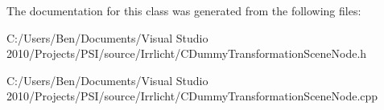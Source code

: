 The documentation for this class was generated from the following files\-:\begin{DoxyCompactItemize}
\item 
C\-:/\-Users/\-Ben/\-Documents/\-Visual Studio 2010/\-Projects/\-P\-S\-I/source/\-Irrlicht/C\-Dummy\-Transformation\-Scene\-Node.\-h\item 
C\-:/\-Users/\-Ben/\-Documents/\-Visual Studio 2010/\-Projects/\-P\-S\-I/source/\-Irrlicht/C\-Dummy\-Transformation\-Scene\-Node.\-cpp\end{DoxyCompactItemize}
